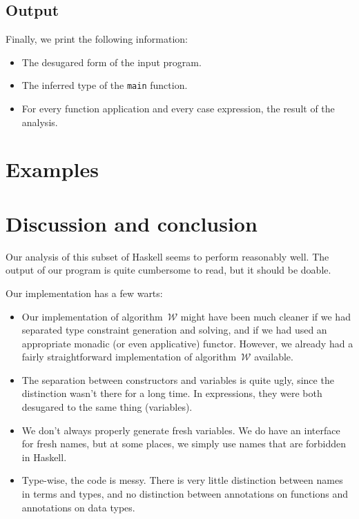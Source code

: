 \documentclass[a4paper]{scrartcl}
\newcommand{\algow}{algorithm~$\mathcal{W}$}
\begin{document}
\subsection{Output}
Finally, we print the following information:
\begin{itemize}
\item The desugared form of the input program.
\item The inferred type of the \texttt{main} function.
\item For every function application and every case expression, the result of
    the analysis.
\end{itemize}

\section{Examples}


\section{Discussion and conclusion}
Our analysis of this subset of Haskell seems to perform reasonably well.
The output of our program is quite cumbersome to read, but it should be
doable.

Our implementation has a few warts:
\begin{itemize}
\item
    Our implementation of \algow{} might have been much cleaner
    if we had separated type constraint generation and solving,
    and if we had used an appropriate monadic (or even applicative)
    functor. However, we already had a fairly straightforward
    implementation of \algow{} available.
\item
    The separation between constructors and variables is quite ugly,
    since the distinction wasn't there for a long time. In expressions,
    they were both desugared to the same thing (variables).
\item
    We don't always properly generate fresh variables. We do have
    an interface for fresh names, but at some places, we simply use
    names that are forbidden in Haskell.
\item
    Type-wise, the code is messy. There is very little distinction
    between names in terms and types, and no distinction between
    annotations on functions and annotations on data types.
\end{itemize}
\end{document}
